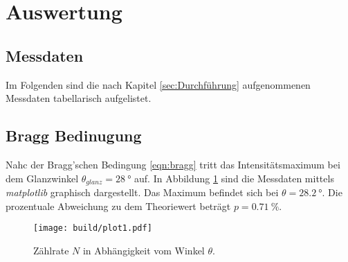 \section{Auswertung}
\label{sec:Auswertung}
\subsection{Messdaten}
Im Folgenden sind die nach Kapitel \ref{sec:Durchführung} aufgenommenen Messdaten tabellarisch aufgelistet. 



\subsection{Bragg Bedinugung}
\label{sec:brag}
Nahc der Bragg'schen Bedingung \eqref{eqn:bragg} tritt das Intensitätsmaximum bei dem Glanzwinkel $\theta_{glanz}=\SI{28}{\degree}$ auf. 
In Abbildung \ref{fig:plot1} sind die Messdaten mittels \textit{matplotlib} \cite{matplotlib} graphisch dargestellt. Das Maximum befindet 
sich bei $\theta=\SI{28.2}{\degree}$. Die prozentuale Abweichung zu dem Theoriewert beträgt $p=\SI{0.71}{\percent}$.
\begin{figure}
    \centering
    \texttt{[image: build/plot1.pdf]}
    \caption{Zählrate $N$ in Abhängigkeit vom Winkel $\theta$.}
    \label{fig:plot1}
\end{figure}

